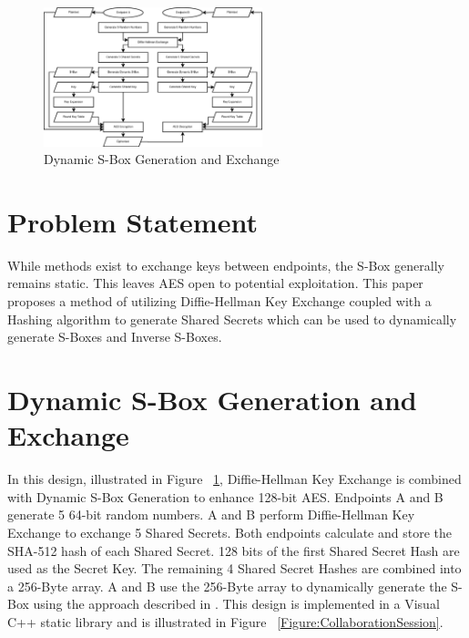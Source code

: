 \documentclass[journal]{IEEEtran}
\begin{document}
\begin{figure}[!t]
	\centering
	\includegraphics[width=2.5in]{AESDynamicSBox}
	\caption{Dynamic S-Box Generation and Exchange}
	\label{Figure:DynamicSBoxExchange}
\end{figure}

\section{Problem Statement}
While methods exist to exchange keys between endpoints, the S-Box generally remains static. This leaves AES
open to potential exploitation. This paper proposes a method of utilizing Diffie-Hellman Key Exchange coupled
with a Hashing algorithm to generate Shared Secrets which can be used to dynamically generate S-Boxes and 
Inverse S-Boxes.

\section{Dynamic S-Box Generation and Exchange}
In this design, illustrated in Figure ~\ref{Figure:DynamicSBoxExchange}, Diffie-Hellman Key Exchange is combined with Dynamic S-Box Generation to enhance 128-bit AES. Endpoints A and B generate 5 64-bit random numbers. A and B perform Diffie-Hellman Key Exchange to exchange 5 Shared Secrets. Both endpoints calculate and store the SHA-512 hash of each Shared Secret. 128 bits of the first Shared Secret Hash are used as the Secret Key. The remaining 4 Shared Secret Hashes are combined into a 256-Byte array. A and B use the 256-Byte array to dynamically generate the S-Box using the approach described in \cite{AESKeySBox}. This design is implemented in a Visual C++ static library and is illustrated in Figure ~\ref{Figure:CollaborationSession}. 
\end{document}
